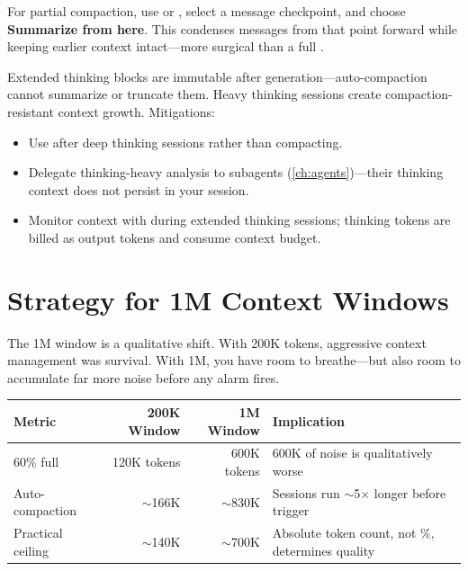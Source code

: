 For partial compaction, use  or ,
select a message checkpoint, and choose \textbf{Summarize from here}.
This condenses messages from that point forward while keeping
earlier context intact---more surgical than a full .

\begin{warnbox}
\label{warn:thinking-compaction}
Extended thinking blocks are immutable after generation---auto-compaction
cannot summarize or truncate them. Heavy thinking sessions create
compaction-resistant context growth. Mitigations:
\begin{itemize}
  \item Use  after deep thinking sessions rather than compacting.
  \item Delegate thinking-heavy analysis to subagents (\cref{ch:agents})---their
    thinking context does not persist in your session.
  \item Monitor context with  during extended thinking sessions;
    thinking tokens are billed as output tokens and consume context budget.
\end{itemize}
\end{warnbox}

\section{Strategy for 1M Context Windows}
\label{sec:1m-strategy}



The 1M window is a qualitative shift.
With 200K tokens, aggressive context management was survival.
With 1M, you have room to breathe---but also room
to accumulate far more noise before any alarm fires.

\begin{fullwidth}
\begin{tabular}{@{}lrrp{5.5cm}@{}}
\toprule
\textbf{Metric} & \textbf{200K Window} & \textbf{1M Window} & \textbf{Implication} \\
\midrule
60\% full & 120K tokens & 600K tokens & 600K of noise is qualitatively worse \\
Auto-compaction & $\sim$166K & $\sim$830K & Sessions run $\sim$5$\times$ longer before trigger \\
Practical ceiling & $\sim$140K & $\sim$700K & Absolute token count, not \%, determines quality \\
\bottomrule
\end{tabular}
\end{fullwidth}

